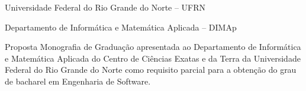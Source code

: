 
\instituicao
{
	Universidade Federal do Rio Grande do Norte -- UFRN \par 
	Departamento de Informática e Matemática Aplicada -- DIMAp
}
	
\comentario
{
	Proposta Monografia de Graduação apresentada ao Departamento de Informática e Matemática Aplicada do 
	Centro de Ciências Exatas e da Terra da Universidade Federal do Rio Grande do Norte como
	requisito parcial para a obtenção do grau de bacharel em Engenharia de Software.
}
		
	
\folhaderosto